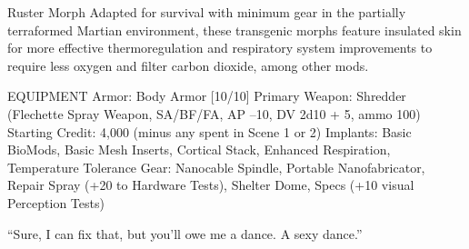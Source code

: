 Ruster Morph
Adapted for survival with minimum gear in the partially terraformed Martian environment, these transgenic morphs feature insulated skin for more effective thermoregulation and respiratory system improvements to require less oxygen and filter carbon dioxide, among other mods. 

EQUIPMENT
Armor: Body Armor [10/10]
Primary Weapon: Shredder (Flechette Spray Weapon, SA/BF/FA, AP –10, DV 2d10 + 5, ammo 100)
Starting Credit: 4,000 (minus any spent in Scene 1 or 2) 
Implants: Basic BioMods, Basic Mesh Inserts, Cortical Stack, Enhanced Respiration, Temperature Tolerance
Gear: Nanocable Spindle, Portable Nanofabricator, Repair Spray (+20 to Hardware Tests), Shelter Dome, Specs (+10 visual Perception Tests)

“Sure, I can fix that, but you'll owe me a dance. A sexy dance.”


